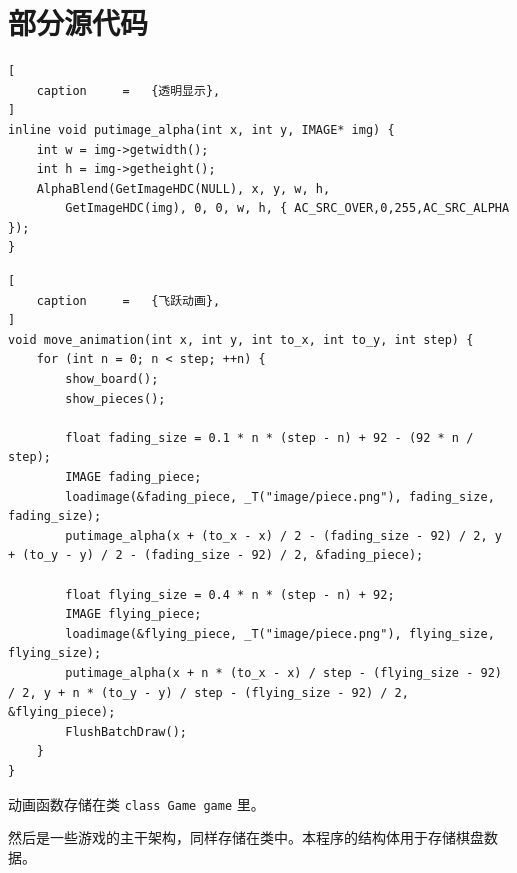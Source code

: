 \documentclass[12pt,a4paper,twoside]{ctexart}
\numberwithin{figure}{section}
\numberwithin{equation}{section}
\begin{document}
\newpage
\section{部分源代码}

\begin{lstlisting}[
    caption     =   {透明显示},
]
inline void putimage_alpha(int x, int y, IMAGE* img) {
	int w = img->getwidth();
	int h = img->getheight();
	AlphaBlend(GetImageHDC(NULL), x, y, w, h,
		GetImageHDC(img), 0, 0, w, h, { AC_SRC_OVER,0,255,AC_SRC_ALPHA });
}
\end{lstlisting}

\begin{lstlisting}[
    caption     =   {飞跃动画},
]
void move_animation(int x, int y, int to_x, int to_y, int step) {
    for (int n = 0; n < step; ++n) {
        show_board();
        show_pieces();

        float fading_size = 0.1 * n * (step - n) + 92 - (92 * n / step);
        IMAGE fading_piece;
        loadimage(&fading_piece, _T("image/piece.png"), fading_size, fading_size);
        putimage_alpha(x + (to_x - x) / 2 - (fading_size - 92) / 2, y + (to_y - y) / 2 - (fading_size - 92) / 2, &fading_piece);

        float flying_size = 0.4 * n * (step - n) + 92;
        IMAGE flying_piece;
        loadimage(&flying_piece, _T("image/piece.png"), flying_size, flying_size);
        putimage_alpha(x + n * (to_x - x) / step - (flying_size - 92) / 2, y + n * (to_y - y) / step - (flying_size - 92) / 2, &flying_piece);
        FlushBatchDraw();
    }
}
\end{lstlisting}

动画函数存储在类 \verb|class Game game| 里。

然后是一些游戏的主干架构，同样存储在类中。本程序的结构体用于存储棋盘数据。
\end{document}
